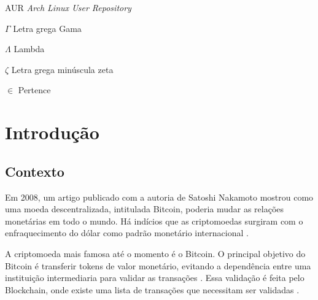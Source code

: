 \documentclass[
article,			%
12pt,				%
openright,			%
oneside,			%
a4paper,			%
chapter=TITLE,		%
section=TITLE,		%
subsection=TITLE,	%
subsubsection=TITLE,%
subsubsubsection=TITLE, %
english,			%
brazil,				%
]{abntex2}
\begin{document}

\listoffigures*
\cleardoublepage

\listoftables*
\cleardoublepage

\begin{siglas}
\item[AUR] \emph{Arch Linux User Repository} 
\end{siglas}

\begin{simbolos}
\item[$ \Gamma $] Letra grega Gama
\item[$ \Lambda $] Lambda
\item[$ \zeta $] Letra grega minúscula zeta
\item[$ \in $] Pertence
\end{simbolos}

\tableofcontents*
\cleardoublepage


\textual

\section{Introdução}

\subsection{Contexto}

Em 2008, um artigo publicado com a autoria de Satoshi Nakamoto mostrou
como uma moeda descentralizada, intitulada Bitcoin, poderia mudar as
relações monetárias em todo o mundo. Há indícios que as criptomoedas
surgiram com o enfraquecimento do dólar como padrão monetário
internacional \cite{FAE2014}. 

A criptomoeda mais famosa até o momento é o Bitcoin. O principal
objetivo do Bitcoin é transferir tokens de valor monetário, evitando a
dependência entre uma instituição intermediaria para validar as
transações \cite{Nakamoto2008}. Essa validação é feita pelo
Blockchain, onde existe uma lista de transações que necessitam ser
validadas \cite{Economist2015}.
\end{document}
